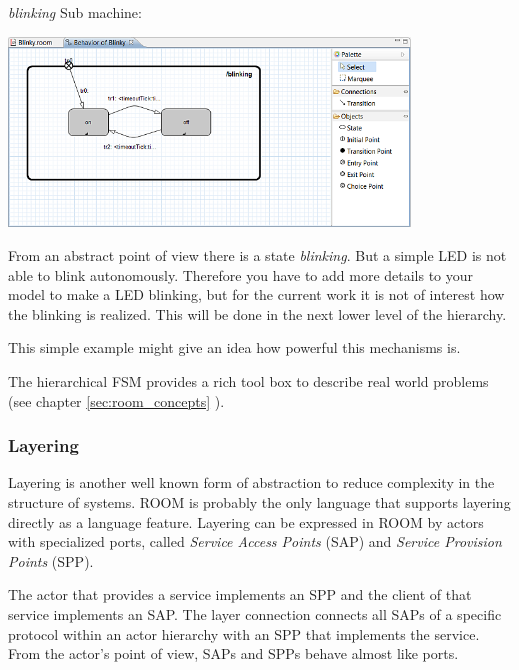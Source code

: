 \textit{blinking} Sub machine:

\includegraphics[width=0.8\textwidth]{images/020-Blinky151.png}

From an abstract point of view there is a state \textit{blinking}. But a simple LED is not able to blink 
autonomously. Therefore you have to add more details to your model to make a LED blinking, but for the 
current work it is not of interest how the blinking is realized. This will be done in the next lower level 
of the hierarchy. 

This simple example might give an idea how powerful this mechanisms is.

The hierarchical FSM provides a rich tool box to describe real world problems (see chapter \ref{sec:room_concepts} ).

\subsubsection{Layering}

Layering is another well known form of abstraction to reduce complexity in the structure of systems. ROOM 
is probably the only language that supports layering directly as a language feature.
Layering can be expressed in ROOM by actors with specialized ports, called \emph{Service Access Points} 
(SAP) and \emph{Service Provision Points} (SPP).

The actor that provides a service implements an SPP and the client of that service implements an SAP. The 
layer connection connects all SAPs of a specific protocol within an actor hierarchy with an SPP that 
implements the service. From the actor's point of view, SAPs and SPPs behave almost like ports.

